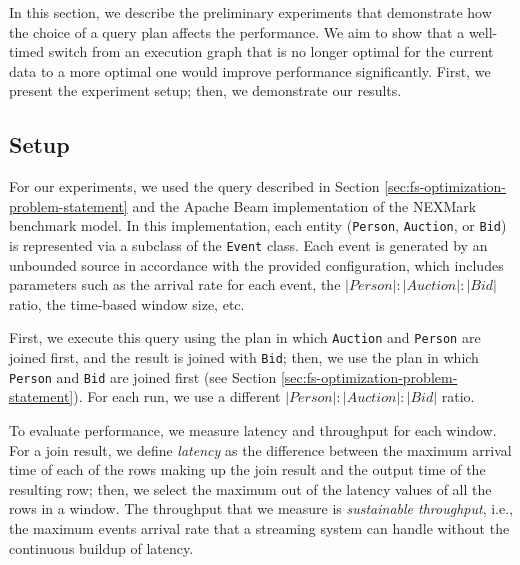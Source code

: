 \label {sec:fs-optimization-experiments}
In this section, we describe the preliminary experiments that demonstrate how the choice of a query plan affects the performance. We aim to show that a well-timed switch from an execution graph that is no longer optimal for the current data to a more optimal one would improve performance significantly. First, we present the experiment setup; then, we demonstrate our results. 
\subsection{Setup}

For our experiments, we used the query described in Section \ref{sec:fs-optimization-problem-statement} and the Apache Beam implementation of the NEXMark benchmark model. In this implementation, each entity (\texttt{Person}, \texttt{Auction}, or \texttt{Bid}) is represented via a subclass of the \texttt{Event} class. Each event is generated by an unbounded source in accordance with the provided configuration, which includes parameters such as the arrival rate for each event, the $|Person|:|Auction|:|Bid|$ ratio, the time-based window size, etc. 

First, we execute this query using the plan in which \texttt{Auction} and \texttt{Person} are joined first, and the result is joined with \texttt{Bid}; then, we use the plan in which \texttt{Person} and \texttt{Bid} are joined first (see Section  \ref{sec:fs-optimization-problem-statement}). For each run, we use a different $|Person|:|Auction|:|Bid|$ ratio.

To evaluate performance, we measure latency and throughput for each window. For a join result, we define \textit{latency} as the difference between the maximum arrival time of each of the rows making up the join result and the output time of the resulting row; then, we select the maximum out of the latency values of all the rows in a window. The throughput that we measure is \textit{sustainable throughput}, i.e., the maximum events arrival rate that a streaming system can handle without the continuous buildup of latency.

